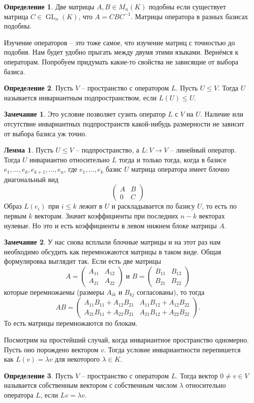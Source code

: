\documentclass[10pt,a4paper,oneside]{book}
\theoremstyle{definition}
\newtheorem*{rem}{\color{green!50!blue}Замечание}
\newtheorem*{defn}{\color{yellow!30!red} Определение}
\newtheorem{lem}{\color{green!50!black}Лемма}
\renewcommand{\leq}{\leqslant}
\newcommand{\GL}{\operatorname{GL}}
\def\dfn{\begin{defn}}
\def\edfn{\end{defn}}
\def\lm{\begin{lem}}
\def\elm{\end{lem}}
\def\rm{\begin{rem}}
\def\erm{\end{rem}}
\def\pmat{\begin{pmatrix}}
\def\epmat{\end{pmatrix}}
\begin{document}
\dfn Две матрицы $A, B \in M_n(K)$ подобны если существует матрица $C \in \GL_n(K)$, что $A=CBC^{-1}$. Матрицы оператора в разных базисах подобны.
\edfn

Изучение операторов -- это тоже самое, что изучение матриц с точностью до подобия. Нам будет удобно прыгать между двумя этими языками.
Вернёмся к операторам. Попробуем придумать какие-то свойства не зависящие от выбора базиса.



\dfn Пусть $V$ -- пространство с оператором $L$. Пусть $U\leq V$. Тогда $U$ называется инвариантным подпространством, если $L(U) \leq U$.
\edfn

\rm Это условие позволяет сузить оператор $L$ с $V$ на $U$. Наличие или отсутствие инвариантных подпространств какой-нибудь размерности не зависит от выбора базиса уж точно.
\erm

\lm Пусть $U\leq V$ -- подпространство, а $L \colon V \to V$ -- линейный оператор. Тогда $U$ инвариантно относительно $L$ тогда и только тогда, когда в базисе $e_1,\dots,e_k,e_{k+1},\dots,e_n$, где $e_1,\dots,e_k$ базис $U$ матрица оператора имеет блочно диагональный вид
$$\pmat A&B\\
0&C \epmat$$
\proof Образ $L(e_i)$ при $i \leq k$ лежит в $U$ и раскладывается по базису $U$, то есть по первым $k$ векторам. Значит коэффициенты при последних $n-k$ векторах нулевые. Но это и есть коэффициенты в левом нижнем блоке матрицы $A$.
\endproof
\elm


\rm У нас снова всплыли блочные матрицы и на этот раз нам необходимо обсудить как перемножаются матрицы в таком виде. Общая формулировка выглядит так. Если есть две матрицы
$$A=\pmat A_{11} & A_{12}\\
A_{21}& A_{22}
\epmat \text{ и } B=\pmat B_{11} & B_{12}\\
B_{21}& B_{22}
\epmat $$
которые перемножаемы (размеры $A_{ik}$ и $B_{kj}$ согласованы), то тогда
$$AB= \pmat A_{11}B_{11}+ A_{12}B_{21} & A_{11}B_{12}+ A_{12}B_{22}\\
A_{21}B_{11}+ A_{22}B_{21}& A_{21}B_{12}+ A_{22}B_{22}\epmat. $$
То есть матрицы перемножаются по блокам.
\erm

Посмотрим на простейший случай, когда инвариантное пространство одномерно. Пусть оно порождено вектором $v$. Тогда условие инвариантности перепишется как $L(v) = \lambda v$ для некоторого $\lambda \in K$.


\dfn Пусть $V$ -- пространство с оператором $L$. Тогда вектор $0\neq v\in V$ называется собственным вектором с собственным числом $\lambda$ относительно оператора $L$, если $Lv=\lambda v$.
\edfn
\end{document}
